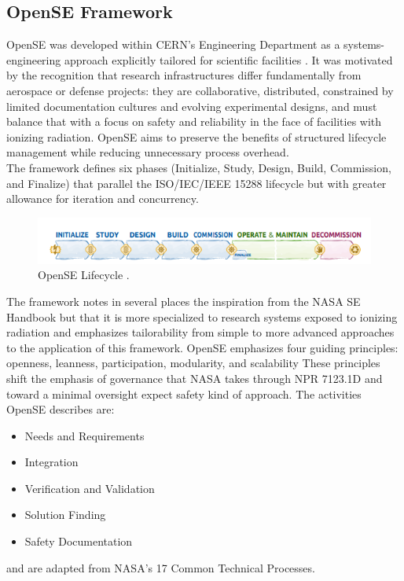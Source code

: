 \subsection{OpenSE Framework}
\label{sub:opense}
OpenSE was developed within CERN’s Engineering Department as a systems-engineering approach explicitly tailored for scientific facilities \cite{cern2016opense,bonnal2018opense}. 
It was motivated by the recognition that research infrastructures differ fundamentally from aerospace or defense projects: they are collaborative, distributed, constrained by limited documentation cultures and evolving experimental designs, and must balance that with a focus on safety and reliability in the face of facilities with ionizing radiation. 
OpenSE aims to preserve the benefits of structured lifecycle management while reducing unnecessary process overhead.\\
The framework defines six phases (Initialize, Study, Design, Build, Commission, and Finalize) that parallel the ISO/IEC/IEEE 15288 lifecycle \cite{iso15288-2023} but with greater allowance for iteration and concurrency. \\
\begin{figure}[h!]
  \centering
  \includegraphics[width=0.9\linewidth]{figures/openSElifecycle.png}
  \caption{OpenSE Lifecycle
  \cite{cern2016opense}.}
  \label{fig:openSE_lifecycle}
\end{figure}

The framework notes in several places the inspiration from the NASA SE Handbook but that it is more specialized to research systems exposed to ionizing radiation and emphasizes tailorability from simple to more advanced approaches to the application of this framework\cite{cern2016opense}.
OpenSE emphasizes four guiding principles: openness, leanness, participation, modularity, and scalability\cite{cern2016opense}
These principles shift the emphasis of governance that NASA takes through NPR 7123.1D \cite{npr7123.1D} and toward a minimal oversight expect safety kind of approach. The activities OpenSE describes are:
\begin{itemize}[noitemsep, topsep=0pt]
    \item Needs and Requirements 
    \item Integration
    \item Verification and Validation
    \item Solution Finding
    \item Safety Documentation
\end{itemize}
and are adapted from NASA's 17 Common Technical Processes.
